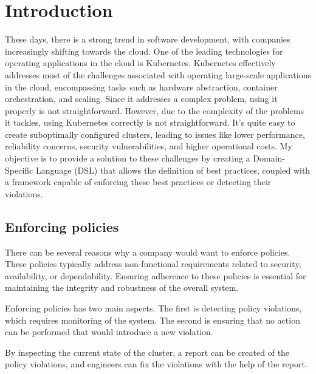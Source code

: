 \setlength{\parindent}{0pt}
\setlength{\parskip}{0.6em}

\chapter{Introduction}
\label{chap:intro}

These days, there is a strong trend in software development, with companies increasingly shifting towards the cloud. One of the leading technologies for operating applications in the cloud is Kubernetes. Kubernetes effectively addresses most of the challenges associated with operating large-scale applications in the cloud, encompassing tasks such as hardware abstraction, container orchestration, and scaling. Since it addresses a complex problem, using it properly is not straightforward. However, due to the complexity of the problems it tackles, using Kubernetes correctly is not straightforward. It's quite easy to create suboptimally configured clusters, leading to issues like lower performance, reliability concerns, security vulnerabilities, and higher operational costs. My objective is to provide a solution to these challenges by creating a Domain-Specific Language (DSL) that allows the definition of best practices, coupled with a framework capable of enforcing these best practices or detecting their violations.

\section{Enforcing policies}

There can be several reasons why a company would want to enforce policies. These policies typically address non-functional requirements related to security, availability, or dependability. Ensuring adherence to these policies is essential for maintaining the integrity and robustness of the overall system.

Enforcing policies has two main aspects. The first is detecting policy violations, which requires monitoring of the system. The second is ensuring that no action can be performed that would introduce a new violation.

By inspecting the current state of the cluster, a report can be created of the policy violations, and engineers can fix the violations with the help of the report.

